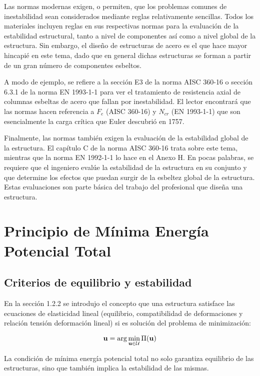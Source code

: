 Las normas modernas exigen, o permiten, que los problemas comunes de inestabilidad sean considerados mediante reglas relativamente sencillas. Todos los materiales incluyen reglas en sus respectivas normas para la evaluación de la estabilidad estructural, tanto a nivel de componentes así como a nivel global de la estructura. %
Sin embargo, el diseño de estructuras de acero es el que hace mayor hincapié en este tema, dado que en general dichas estructuras se forman a partir de un gran número de componentes esbeltos. 

A modo de ejemplo, se refiere a la sección E3 de la norma AISC 360-16 o sección 6.3.1 de la norma EN 1993-1-1 para ver el tratamiento de resistencia axial de columnas esbeltas de acero que fallan por inestabilidad. %
%
El lector encontrará que las normas hacen referencia a $F_e$ (AISC 360-16) y $N_{cr}$ (EN 1993-1-1) que son esencialmente la carga crítica que Euler descubrió en 1757.

Finalmente, las normas también exigen la evaluación de la estabilidad global de la estructura. El capítulo C de la norma AISC 360-16 trata sobre este tema, mientras que la norma EN 1992-1-1 lo hace en el Anexo H. %
%
En pocas palabras, se requiere que el ingeniero evalúe la estabilidad de la estructura en su conjunto y que determine los efectos que puedan surgir de la esbeltez global de la estructura. Estas evaluaciones son parte básica del trabajo del profesional que diseña una estructura.


\section{Principio de Mínima Energía Potencial Total}

\subsection{Criterios de equilibrio y estabilidad} 
En la sección 1.2.2 se introdujo el concepto que una estructura satisface las ecuaciones de elasticidad lineal (equilibrio, compatibilidad de deformaciones y relación tensión deformación lineal) si es solución del problema de minimización:

\begin{equation*}
{\bf u} = \arg\min_{{\bf u}\in{\mathcal U}} \Pi({\bf u})
\end{equation*}

La condición de mínima energía potencial total no solo garantiza equilibrio de las estructuras, sino que también implica la estabilidad de las mismas.

